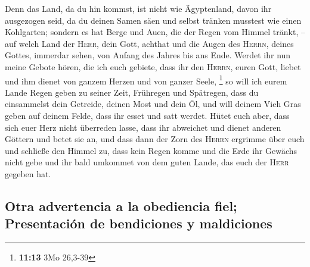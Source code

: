  Denn das Land, da du hin kommst, ist nicht wie
Ägyptenland, davon ihr ausgezogen seid, da du deinen Samen säen und
selbst tränken musstest wie einen Kohlgarten;  sondern es
hat Berge und Auen, die der Regen vom Himmel tränkt, -- 
auf welch Land der \textsc{Herr}, dein Gott, achthat und die Augen des
\textsc{Herrn}, deines Gottes, immerdar sehen, von Anfang des Jahres bis
ans Ende.  Werdet ihr nun meine Gebote hören, die ich
euch gebiete, dass ihr den \textsc{Herrn}, euren Gott, liebet und ihm
dienet von ganzem Herzen und von ganzer Seele, \footnote{\textbf{11:13}
  3Mo 26,3-39}  so will ich eurem Lande Regen geben zu
seiner Zeit, Frühregen und Spätregen, dass du einsammelst dein Getreide,
deinen Most und dein Öl,  und will deinem Vieh Gras geben
auf deinem Felde, dass ihr esset und satt werdet.  Hütet
euch aber, dass sich euer Herz nicht überreden lasse, dass ihr abweichet
und dienet anderen Göttern und betet sie an,  und dass
dann der Zorn des \textsc{Herrn} ergrimme über euch und schließe den
Himmel zu, dass kein Regen komme und die Erde ihr Gewächs nicht gebe und
ihr bald umkommet von dem guten Lande, das euch der \textsc{Herr}
gegeben hat.

\hypertarget{otra-advertencia-a-la-obediencia-fiel-presentaciuxf3n-de-bendiciones-y-maldiciones}{%
\subsection{Otra advertencia a la obediencia fiel; Presentación de
bendiciones y
maldiciones}\label{otra-advertencia-a-la-obediencia-fiel-presentaciuxf3n-de-bendiciones-y-maldiciones}}

